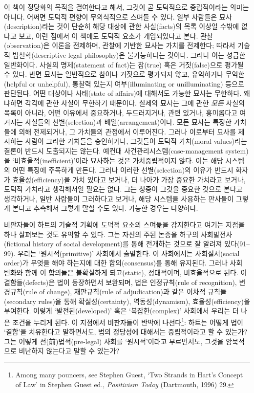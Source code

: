 \documentclass[12pt, oneside]{book}  %
\begin{document}
이 책이 정당화의 목적을 결여한다고 해서, 그것이 곧 도덕적으로
중립적이라는 의미는 아니다. 어쩌면 도덕적 편향이 무의식적으로 스며들 수
있다. 일부 사람들은 묘사(description)라는 것이 단순히 해당 대상에 관한
사실(facts)의 목록 이상일 수밖에 없다고 보고, 이런 점에서 이 책에도
도덕적 요소가 개입되었다고 본다. 관찰(observation)은 이론을 전제하며,
관찰에 기반한 묘사는 가치를 전제한다; 따라서 기술적 법철학(descriptive
legal philosophy)은 불가능하다는 것이다. 그러나 이는 성급한 일반화이다.
사실의 명제(statement of fact)는 참(true) 혹은 거짓(false)으로 평가될 수
있다. 반면 묘사는 일반적으로 참이나 거짓으로 평가되지 않고, 유익하거나
무익한(helpful or unhelpful), 통찰력 있는지 여부(illuminating or
unilluminating) 등으로 판단된다. 어떤 대상이나 사태(state of affairs)에
대해서도 가능한 묘사는 무한하다. 왜냐하면 각각에 관한 사실이 무한하기
때문이다. 실제의 묘사는 그에 관한 \emph{모든} 사실의 목록이 아니라, 어떤
이유에서 중요하거나, 두드러지거나, 관련 있거나, 흥미롭다고 여겨지는
사실들의 선별(selection)과 배열(arrangement)이다. 모든 묘사는 특정한
가치들에 의해 전제되거나, 그 가치들의 관점에서 이루어진다. 그러나
이로부터 묘사를 제시하는 사람이 그러한 가치들을 승인하거나, 그것들이
도덕적 가치(moral values)라는 결론이 반드시 도출되지는 않는다. 예컨대
사건관리시스템(case-management system)을 `비효율적(inefficient)'이라
묘사하는 것은 가치중립적이지 않다. 이는 해당 시스템의 어떤 특징에
주목하게 만든다. 그러나 이러한 선별(selection)의 이유가 반드시 화자가
효율성(efficiency)을 가치 있다고 보거나, 더 나아가 가장 중요한 가치라고
보거나, 도덕적 가치라고 생각해서일 필요는 없다. 그는 청중이 그것을
중요한 것으로 본다고 생각하거나, 일반 사람들이 그러하다고 보거나, 해당
시스템을 사용하는 판사들이 그렇게 본다고 추측해서 그렇게 말할 수도 있다.
가능한 경우는 다양하다.

비판자들이 하트의 기술적 기획에 도덕적 요소의 스며듦을 감지한다고 여기는
지점을 하나 살펴보는 것도 유익할 수 있다. 그는 자신의 주된 논증을 허구의
사회발전사(fictional history of social development)를 통해 전개하는
것으로 잘 알려져 있다(91--99). 우리는 `원시적(primitive)' 사회에서
출발한다. 이 사회에서는 사회질서(social order)가 무엇을 해야 하는지에
대한 합의(consensus)를 통해 유지된다. 그러나 사회 변화와 함께 이
합의들은 불확실하게 되고(static), 정태적이며, 비효율적으로 된다. 이
결함들(defects)은 법이 등장하면서 보완되며, 법은 인정규칙(rule of
recognition), 변경규칙(rule of change), 재판규칙(rule of adjudication)과
같은 이차적 규칙들(secondary rules)을 통해 확실성(certainty),
역동성(dynamism), 효율성(efficiency)을 부여한다. 이렇게
`발전된(developed)' 혹은 `복잡한(complex)' 사회에서 우리는 더 나은
조건을 누리게 된다. 이 지점에서 비판자들이 반박에 나선다\footnote{Among
  many pouncers, see Stephen Guest, `Two Strands in Hart's Concept of
  Law' in Stephen Guest ed., \emph{Positivism Today} (Dartmouth, 1996)
  29.}: 하트는 어떻게 법이 `결함'을 치유한다고 말하면서도, 법의 정당성에
대해서는 중립적이라고 할 수 있는가? 그는 어떻게 전(前)법적(pre-legal)
사회를 `원시적'이라고 부르면서도, 그것을 암묵적으로 비난하지 않는다고
말할 수 있는가?
\end{document}

